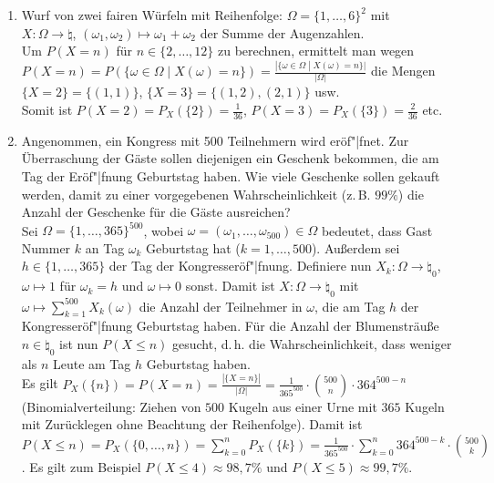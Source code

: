 \linie
\pagebreak

\begin{Bsp}
    \begin{enumerate}
        \item
        Wurf von zwei fairen Würfeln mit Reihenfolge:
        $\Omega = \{1, \dotsc, 6\}^2$ mit\\
        $X\colon \Omega \rightarrow \natural$, $(\omega_1, \omega_2) \mapsto \omega_1 + \omega_2$
        der Summe der Augenzahlen.\\
        Um $P(X = n)$ für $n \in \{2, \dotsc, 12\}$ zu berechnen, ermittelt man wegen\\
        $P(X = n) = P(\{\omega \in \Omega \;|\; X(\omega) = n\}) =
        \frac{|\{\omega \in \Omega \;|\; X(\omega) = n\}|}{|\Omega|}$ die Mengen
        $\{X = 2\} = \{(1, 1)\}$, $\{X = 3\} = \{(1, 2), (2, 1)\}$ usw.\\
        Somit ist $P(X = 2) = P_X(\{2\}) = \frac{1}{36}$,
        $P(X = 3) = P_X(\{3\}) = \frac{2}{36}$ etc.

        \item
        Angenommen, ein Kongress mit 500 Teilnehmern wird eröf"|fnet.
        Zur Überraschung der Gäste sollen diejenigen ein Geschenk bekommen, die am Tag der
        Eröf"|fnung Geburtstag haben.
        Wie viele Geschenke sollen gekauft werden, damit zu einer vorgegebenen Wahrscheinlichkeit
        (z.\,B. $99\%$) die Anzahl der Geschenke für die Gäste ausreichen?\\
        Sei $\Omega = \{1, \dotsc, 365\}^{500}$, wobei
        $\omega = (\omega_1, \dotsc, \omega_{500}) \in \Omega$ bedeutet, dass Gast Nummer $k$
        an Tag $\omega_k$ Geburtstag hat ($k = 1, \dotsc, 500$).
        Außerdem sei $h \in \{1, \dotsc, 365\}$ der Tag der Kongresseröf"|fnung.
        Definiere nun $X_k\colon \Omega \rightarrow \natural_0$,
        $\omega \mapsto 1$ für $\omega_k = h$ und $\omega \mapsto 0$ sonst.
        Damit ist $X\colon \Omega \rightarrow \natural_0$ mit
        $\omega \mapsto \sum_{k=1}^{500} X_k(\omega)$ die Anzahl der Teilnehmer in $\omega$,
        die am Tag $h$ der Kongresseröf"|fnung Geburtstag haben.
        Für die Anzahl der Blumensträuße $n \in \natural_0$ ist nun $P(X \le n)$ gesucht,
        d.\,h. die Wahrscheinlichkeit, dass weniger als $n$ Leute am Tag $h$ Geburtstag haben.\\
        Es gilt $P_X(\{n\}) = P(X = n) = \frac{|\{X = n\}|}{|\Omega|} =
        \frac{1}{365^{500}} \cdot \binom{500}{n} \cdot 364^{500-n}$
        (Binomialverteilung: Ziehen von $500$ Kugeln aus einer Urne mit $365$ Kugeln mit
        Zurücklegen ohne Beachtung der Reihenfolge).
        Damit ist $P(X \le n) = P_X(\{0, \dotsc, n\}) = \sum_{k=0}^n P_X(\{k\})
        = \frac{1}{365^{500}} \cdot \sum_{k=0}^n 364^{500-k} \cdot \binom{500}{k}$.
        Es gilt zum Beispiel $P(X \le 4) \approx 98{,}7\%$ und
        $P(X \le 5) \approx 99{,}7\%$.
    \end{enumerate}
\end{Bsp}

